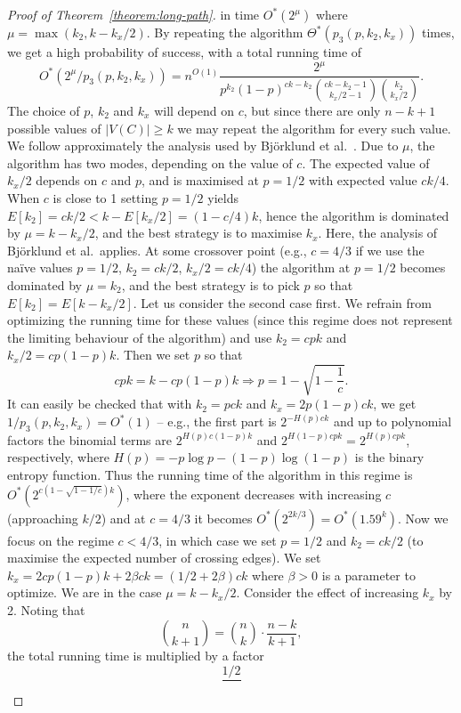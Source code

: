 \documentclass{theoretics}
\begin{document}
\begin{proof}[Proof of Theorem~\ref{theorem:long-path}]
  in time $O^*(2^{\mu})$ where $\mu=\max(k_2,k-k_x/2)$.
  By repeating the algorithm $\Theta^*(p_3(p,k_2,k_x))$ times,
  we get a high probability of success, with a total running time of
  \[
    O^*(2^\mu/p_3(p, k_2, k_x)) = n^{O(1)}
    \frac{2^\mu}{p^{k_2}(1-p)^{ck-k_2}  \binom{ck-k_2-1}{k_x/2-1} \binom{k_2}{k_x/2}}.
  \]
  The choice of $p$, $k_2$ and $k_x$ will depend on $c$, but since
  there are only $n-k+1$ possible values of $|V(C)| \geq k$ we may
  repeat the algorithm for every such value. We follow approximately
  the analysis used by Bj\"orklund et al.~\cite{BjorklundHKK17narrow}.
  Due to $\mu$, the algorithm has two modes, depending on the value of $c$.
  The expected value of $k_x/2$ depends on $c$ and $p$, and is maximised
  at $p=1/2$ with expected value $ck/4$. When $c$ is close to 1 setting $p=1/2$
  yields $E[k_2]=ck/2 < k-E[k_x/2]=(1-c/4)k$, hence the algorithm is
  dominated by $\mu=k-k_x/2$, and the best strategy is to maximise $k_x$.
  Here, the analysis of Bj\"orklund et al.\ applies. At some crossover point
  (e.g., $c = 4/3$ if we use the na\"ive values $p=1/2$, $k_2=ck/2$,
  $k_x/2=ck/4$) the algorithm at $p=1/2$ becomes dominated by $\mu=k_2$,
  and the best strategy is to pick $p$ so that $E[k_2]=E[k-k_x/2]$.
  Let us consider the second case first. We refrain from optimizing
  the running time for these values (since this regime does not
  represent the limiting behaviour of the algorithm) and 
  use $k_2=cpk$ and $k_x/2=cp(1-p)k$. Then we set $p$ so that
  \[
    cpk = k-cp(1-p)k \Rightarrow p = 1-\sqrt{1-\frac{1}{c}}.
  \]
  It can easily be checked that with $k_2=pck$ and $k_x=2p(1-p)ck$,
  we get $1/p_3(p,k_2,k_x)=O^*(1)$ -- e.g., the first part is $2^{-H(p)ck}$
  and up to polynomial factors the binomial terms are $2^{H(p)c(1-p)k}$
  and $2^{H(1-p)cpk}=2^{H(p)cpk}$, respectively, where $H(p)=-p\log p-(1-p)\log (1-p)$ 
  is the binary entropy function. Thus the running time of the
  algorithm in this regime is $O^*(2^{c(1-\sqrt{1-1/c})k})$,
  where the exponent decreases with increasing $c$ (approaching $k/2$)
  and at $c=4/3$ it becomes $O^*(2^{2k/3})=O^*(1.59^k)$.
  Now we focus on the regime $c<4/3$, in which case we set $p=1/2$
  and $k_2=ck/2$ (to maximise the expected number of crossing edges).
  We set $k_x=2cp(1-p)k + 2\beta c k=(1/2 + 2\beta)ck$ where $\beta > 0$
  is a parameter to optimize. We are in the case $\mu = k-k_x/2$. Consider
  the effect of increasing $k_x$ by 2. Noting that
  \[
    \binom{n}{k+1} = \binom{n}{k} \cdot \frac{n-k}{k+1},
  \]
  the total running time is multiplied by a factor
  \[
    \frac{1/2}{
}\]
\end{proof}
\end{document}
